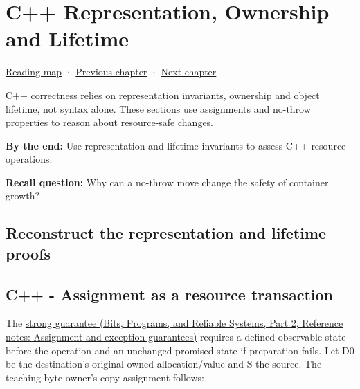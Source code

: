 \chapter{C++ Representation, Ownership and Lifetime}\label{03-visual-computing-i-ch018-c-representation-ownership-and-lifetime}\hypertarget{03-visual-computing-i-ch018}{}\label{stagechapter:03-visual-computing-i-ch018}

\hypertarget{03-visual-computing-i-ch018-c-representation-ownership-and-lifetime}{}

\hyperref[volume-reading-map]{Reading map} · \hyperref[03-visual-computing-i-ch017-build-test-and-reproduce-the-program]{Previous chapter} · \hyperref[06-engine-ii-ch042]{Next chapter}

C++ correctness relies on representation invariants, ownership and object lifetime, not syntax alone. These sections use assignments and no-throw properties to reason about resource-safe changes.

\textbf{By the end:} Use representation and lifetime invariants to assess C++ resource operations.

\textbf{Recall question:} Why can a no-throw move change the safety of container growth?

\section{Reconstruct the representation and lifetime proofs}\label{03-visual-computing-i-ch018-reconstruct-the-representation-and-lifetime-proofs}

\hypertarget{03-visual-computing-i-ch018-reconstruct-the-representation-and-lifetime-proofs}{}

\section{C++ - Assignment as a resource transaction}\label{03-visual-computing-i-ch018-c---assignment-as-a-resource-transaction}

\hypertarget{03-visual-computing-i-ch018-c---assignment-as-a-resource-transaction}{}

The \href{../01-Bits-Programs-and-Reliable-Systems-P02/main.pdf\#appendix-bea6beb5350f}{strong guarantee (Bits, Programs, and Reliable Systems, Part 2, Reference notes: Assignment and exception guarantees)} requires a defined observable state before the operation and an unchanged promised state if preparation fails. Let D0 be the destination's original owned allocation/value and S the source. The teaching byte owner's copy assignment follows:

